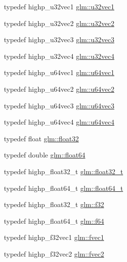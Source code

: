 \begin{DoxyCompactItemize}
\item 
typedef highp\-\_\-u32vec1 \hyperlink{group__gtc__type__precision_ga09dd72852808c32ba398674736b9672a}{glm\-::u32vec1}
\item 
typedef highp\-\_\-u32vec2 \hyperlink{group__gtc__type__precision_gad3a81c0d5a6941bb9ffdc9fa8611b426}{glm\-::u32vec2}
\item 
typedef highp\-\_\-u32vec3 \hyperlink{group__gtc__type__precision_ga16b26751ba6b83c8a0226b9834d73fdc}{glm\-::u32vec3}
\item 
typedef highp\-\_\-u32vec4 \hyperlink{group__gtc__type__precision_ga6e966cda0025699449a36b41f1787927}{glm\-::u32vec4}
\item 
typedef highp\-\_\-u64vec1 \hyperlink{group__gtc__type__precision_gaf0a59fdb715cf4ddf0c4dabf0e2286a9}{glm\-::u64vec1}
\item 
typedef highp\-\_\-u64vec2 \hyperlink{group__gtc__type__precision_gaddd85665767e5d32aee8516f00c45f59}{glm\-::u64vec2}
\item 
typedef highp\-\_\-u64vec3 \hyperlink{group__gtc__type__precision_ga7f104c29d70170cfb2223b29f7985bd4}{glm\-::u64vec3}
\item 
typedef highp\-\_\-u64vec4 \hyperlink{group__gtc__type__precision_gadafdefd5524bf6a48bb7c47edb787ae5}{glm\-::u64vec4}
\item 
typedef float \hyperlink{group__gtc__type__precision_ga814f2f65354b6588b067cc5c67a6b340}{glm\-::float32}
\item 
typedef double \hyperlink{group__gtc__type__precision_gab721f828b41f46b20cf4883b50733d3b}{glm\-::float64}
\item 
typedef highp\-\_\-float32\-\_\-t \hyperlink{group__gtc__type__precision_ga642737ae3e7c434b366f2191e6944bf2}{glm\-::float32\-\_\-t}
\item 
typedef highp\-\_\-float64\-\_\-t \hyperlink{group__gtc__type__precision_gade966a3eb25ebeb16dd53c40d3fdeb46}{glm\-::float64\-\_\-t}
\item 
typedef highp\-\_\-float32\-\_\-t \hyperlink{group__gtc__type__precision_ga0ec999b57f5330d9021256e96038df04}{glm\-::f32}
\item 
typedef highp\-\_\-float64\-\_\-t \hyperlink{group__gtc__type__precision_ga2bba392e555124b36cde6abba349bab3}{glm\-::f64}
\item 
typedef highp\-\_\-f32vec1 \hyperlink{group__gtc__type__precision_gaa732e5d06540922c44d3e35f32d6e948}{glm\-::fvec1}
\item 
typedef highp\-\_\-f32vec2 \hyperlink{group__gtc__type__precision_ga83fb34639f810d0c9240cf7ff0180e20}{glm\-::fvec2}

\end{DoxyCompactItemize}
